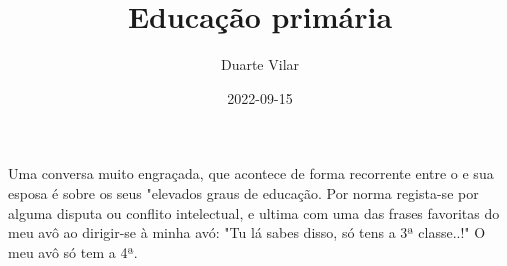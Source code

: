 \documentclass{article}
\title{Educação primária}
\author{Duarte Vilar}
\date{2022-09-15}
\begin{document}
\maketitle

Uma conversa muito engraçada, que acontece de forma recorrente entre o  e sua esposa  é sobre os seus "elevados graus de educação.
Por norma regista-se por alguma disputa ou conflito intelectual, e ultima com uma das frases favoritas do meu avô ao dirigir-se à minha avó: "Tu lá sabes disso, só tens a 3ª classe..!" 
O meu avô só tem a 4ª.

\printindex
\end{document}
